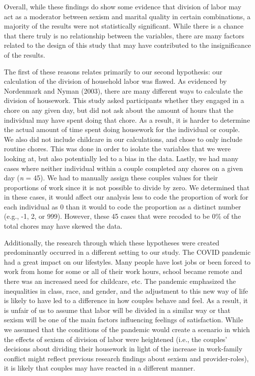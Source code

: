 \documentclass[
  man]{apa6}
\begin{document}
Overall, while these findings do show some evidence that division of labor may act as a moderator between sexism and marital quality in certain combinations, a majority of the results were not statistically significant. While there is a chance that there truly is no relationship between the variables, there are many factors related to the design of this study that may have contributed to the insignificance of the results.

The first of these reasons relates primarily to our second hypothesis: our calculation of the division of household labor was flawed. As evidenced by Nordenmark and Nyman (2003), there are many different ways to calculate the division of housework. This study asked participants whether they engaged in a chore on any given day, but did not ask about the amount of hours that the individual may have spent doing that chore. As a result, it is harder to determine the actual amount of time spent doing housework for the individual or couple. We also did not include childcare in our calculations, and chose to only include routine chores. This was done in order to isolate the variables that we were looking at, but also potentially led to a bias in the data. Lastly, we had many cases where neither individual within a couple completed any chores on a given day (\emph{n} = 45). We had to manually assign these couples values for their proportions of work since it is not possible to divide by zero. We determined that in these cases, it would affect our analysis less to code the proportion of work for each individual as 0 than it would to code the proportion as a distinct number (e.g., -1, 2, or 999). However, these 45 cases that were recoded to be 0\% of the total chores may have skewed the data.

Additionally, the research through which these hypotheses were created predominantly occurred in a different setting to our study. The COVID pandemic had a great impact on our lifestyles. Many people have lost jobs or been forced to work from home for some or all of their work hours, school became remote and there was an increased need for childcare, etc. The pandemic emphasized the inequalities in class, race, and gender, and the adjustment to this new way of life is likely to have led to a difference in how couples behave and feel. As a result, it is unfair of us to assume that labor will be divided in a similar way or that sexism will be one of the main factors influencing feelings of satisfaction. While we assumed that the conditions of the pandemic would create a scenario in which the effects of sexism of division of labor were heightened (i.e., the couples' decisions about dividing their housework in light of the increase in work-family conflict might reflect previous research findings about sexism and provider-roles), it is likely that couples may have reacted in a different manner.
\end{document}
